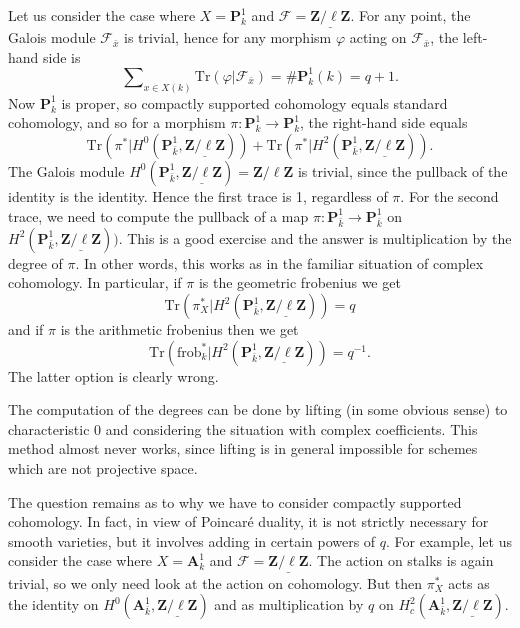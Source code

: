 \medskip\noindent
Let us consider the case where $X = \mathbf{P}^1_k$ and $\mathcal{F} =
\underline{\mathbf{Z}/\ell\mathbf{Z}}$. For any point, the Galois module
$\mathcal{F}_{\bar x}$ is trivial, hence for any morphism $\varphi$ acting on
$\mathcal{F}_{\bar x}$, the left-hand side is
$$
\sum\nolimits_{x \in X(k)} \text{Tr}(\varphi | \mathcal{F}_{\bar x}) =
\#\mathbf{P}^1_k(k) = q+1.
$$
Now $\mathbf{P}^1_k$ is proper, so compactly supported cohomology equals
standard cohomology, and so for a morphism $\pi : \mathbf{P}^1_k \to
\mathbf{P}^1_k$, the right-hand side equals
$$
\text{Tr}(\pi^* | H^0 (\mathbf{P}^1_{\bar k},
\underline{\mathbf{Z}/\ell\mathbf{Z}})) + \text{Tr}(\pi^* | H^2
(\mathbf{P}^1_{\bar k}, \underline{\mathbf{Z}/\ell\mathbf{Z}})).
$$
The Galois module $H^0 (\mathbf{P}^1_{\bar k},
\underline{\mathbf{Z}/\ell\mathbf{Z}}) = \mathbf{Z}/\ell\mathbf{Z}$ is trivial,
since the pullback of the identity is the identity. Hence the first trace is 1,
regardless of $\pi$. For the second trace, we need to compute the pullback of a
map $\pi: \mathbf{P}^1_{\bar k} \to \mathbf{P}^1_{\bar k}$ on $H^2
(\mathbf{P}^1_{\bar k}, \underline{\mathbf{Z}/\ell\mathbf{Z}}))$. This is a
good exercise and the answer is multiplication by the degree of $\pi$. In other
words, this works as in the familiar situation of complex cohomology. In
particular, if $\pi$ is the geometric frobenius we get
$$
\text{Tr}(\pi_X^* | H^2 (\mathbf{P}^1_{\bar k},
\underline{\mathbf{Z}/\ell\mathbf{Z}})) = q
$$
and if $\pi$ is the arithmetic frobenius then we get
$$
\text{Tr}(\text{frob}_k^* | H^2 (\mathbf{P}^1_{\bar k},
\underline{\mathbf{Z}/\ell\mathbf{Z}})) = q^{-1}.
$$
The latter option is clearly wrong.

\begin{remark}
\label{remark-compute-degree-lifting}
The computation of the degrees can be done by lifting (in some obvious sense)
to characteristic 0 and considering the situation with complex coefficients.
This method almost never works, since lifting is in general impossible for
schemes which are not projective space.
\end{remark}

\noindent
The question remains as to why we have to consider compactly supported
cohomology. In fact, in view of Poincar\'e duality, it is not strictly
necessary for smooth varieties, but it involves adding in certain powers
of $q$. For example, let us consider the case where
$X = \mathbf{A}^1_k$ and
$\mathcal{F} = \underline{\mathbf{Z}/\ell\mathbf{Z}}$.
The action on stalks is again trivial, so we only need look at the action
on cohomology. But then $\pi_X^*$ acts as the identity on
$H^0(\mathbf{A}^1_{\bar k}, \underline{\mathbf{Z}/\ell\mathbf{Z}})$
and as multiplication by $q$ on
$H^2_c(\mathbf{A}^1_{\bar k}, \underline{\mathbf{Z}/\ell\mathbf{Z}})$.




